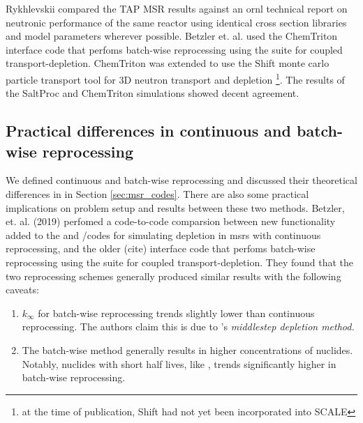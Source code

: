 Rykhlevskii compared the TAP MSR results against an \Gls{ornl} technical report on neutronic performance of the same reactor\cite{betzler_assessment_2017} using identical cross section libraries and model parameters wherever possible. Betzler et. al. used the ChemTriton\cite{betzler_molten_2017} interface code that perfoms batch-wise reprocessing using
the \SCALE suite for coupled transport-depletion. ChemTriton was extended to use the Shift\cite{davidson_nuclide_2018} monte carlo particle transport tool for 3D neutron transport and depletion \footnote{at the time of publication, Shift had not yet been incorporated into SCALE}. The results of the SaltProc and ChemTriton simulations showed decent agreement.


\subsection{Practical differences in continuous and batch-wise reprocessing}
We defined continuous and batch-wise reprocessing and discussed their
theoretical differences in in Section \ref{sec:msr_codes}. There are also some
practical implications on problem setup and results between these two methods.
Betzler, et. al. (2019) \cite{betzler_molten_2019} perfomed a code-to-code
comparsion between new functionality added to the \ORIGEN and \SCALE/\TRITON codes
for simulating depletion in \Gls{msr}s with continuous reprocessing, and the
older \ChemTriton(cite) interface code that perfoms batch-wise reprocessing using
the \SCALE suite for coupled transport-depletion. They found that the two
reprocessing schemes generally produced similar results with the following
caveats:
\begin{enumerate}
    \item $k_{\infty}$ for batch-wise reprocessing trends slightly lower than  continuous reprocessing. The authors claim this is due to \ChemTriton's \it{middlestep depletion method}. 
    \item The batch-wise method generally results in higher concentrations of nuclides. Notably, nuclides with short half lives, like , trends significantly higher in batch-wise reprocessing.
\end{enumerate}


